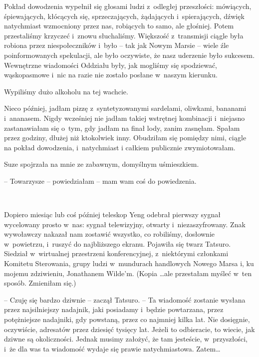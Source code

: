 \documentclass[oneside,polish,11pt,sfheadings]{mwbk}
\begin{document}
Pokład dowodzenia wypełnił się głosami ludzi z~odległej przeszłości:
mówiących, śpiewających, kłócących się, sprzeczających, żądających i~spierających, dźwięk natychmiast wzmocniony przez nas, robiących to
samo, ale głośniej. Potem przestaliśmy krzyczeć i~znowu słuchaliśmy.
Większość z~transmisji ciągle była robiona przez niespołeczników i~było
-- tak jak Nowym Marsie -- wiele źle poinformowanych spekulacji, ale było
oczywiste, że nasz uderzenie było sukcesem. Wewnętrzne wiadomości
Oddziału były, jak mogliśmy się spodziewać, wąskopasmowe i~nic na razie
nie zostało posłane w~naszym kierunku.

Wypiliśmy dużo alkoholu na tej wachcie.

Nieco później, jadłam pizzę z~syntetyzowanymi sardelami, oliwkami,
bananami i~ananasem. Nigdy wcześniej nie jadłam takiej wstrętnej
kombinacji i~niejasno zastanawiałam się o~tym, gdy jadłam na finał lody,
zanim zasnęłam. Spałam przez godziny, dłużej niż ktokolwiek inny.
Obudziłam się pomiędzy nimi, ciągle na pokład dowodzenia, i~natychmiast
i całkiem publicznie zwymiotowałam.

Suze spojrzała na mnie ze zabawnym, domyślnym uśmieszkiem.

-- Towarzysze -- powiedziałam -- mam wam coś do powiedzenia.

~

Dopiero miesiąc lub coś później teleskop Yeng odebrał pierwszy sygnał
wycelowany prosto w~nas: sygnał telewizyjny, otwarty i~niezaszyfrowany.
Znak wywoławczy nakazał nam zostawić wszystko, co robiliśmy, dosłownie w~powietrzu, i~ruszyć do najbliższego ekranu. Pojawiła się twarz Tatsuro.
Siedział w~wirtualnej przestrzeni konferencyjnej, z~niektórymi członkami
Komitetu Sterowania, grupy ludzi w~mundurach handlowych Nowego Marsa i,
ku mojemu zdziwieniu, Jonathanem Wilde'm. (Kopia \ldots  ale przestałam
myśleć w~ten sposób. Zmieniłam się.)

-- Czuję się bardzo dziwnie -- zaczął Tatsuro. -- Ta wiadomość zostanie
wysłana przez najsilniejszy nadajnik, jaki posiadamy i~będzie
powtarzana, przez potężniejsze nadajniki, gdy powstaną, przez co
najmniej kilka lat. Nie dosięgnie, oczywiście, adresatów przez dziesięć
tysięcy lat. Jeżeli to odbieracie, to wiecie, jak dziwne są
okoliczności. Jednak musimy założyć, że tam jesteście, w~przyszłości, i~że dla was ta wiadomość wydaje się prawie natychmiastowa. Zatem\ldots 
\end{document}
